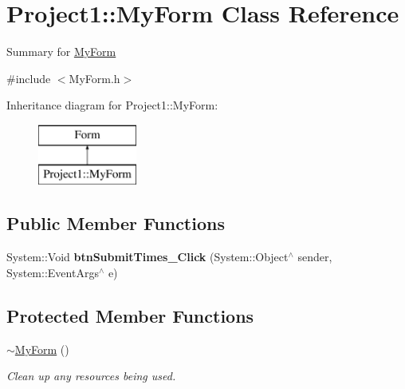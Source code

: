 \hypertarget{class_project1_1_1_my_form}{}\section{Project1\+:\+:My\+Form Class Reference}
\label{class_project1_1_1_my_form}


Summary for \mbox{\hyperlink{class_project1_1_1_my_form}{My\+Form}}  




{\ttfamily \#include $<$My\+Form.\+h$>$}

Inheritance diagram for Project1\+:\+:My\+Form\+:\begin{figure}[H]
\begin{center}
\leavevmode
\includegraphics[height=2.000000cm]{class_project1_1_1_my_form}
\end{center}
\end{figure}
\subsection*{Public Member Functions}
\begin{DoxyCompactItemize}
\item 
\mbox{\label{class_project1_1_1_my_form_ad665941610f014595ab9c9ca8e931765}} 
System\+::\+Void {\bfseries btn\+Submit\+Times\+\_\+\+Click} (System\+::\+Object$^\wedge$ sender, System\+::\+Event\+Args$^\wedge$ e)
\end{DoxyCompactItemize}
\subsection*{Protected Member Functions}
\begin{DoxyCompactItemize}
\item 
\mbox{\hyperlink{class_project1_1_1_my_form_a501b2b4481b72877fc73101f1d6f26be}{$\sim$\+My\+Form}} ()
\begin{DoxyCompactList}\small\item\em Clean up any resources being used. \end{DoxyCompactList}\end{DoxyCompactItemize}
